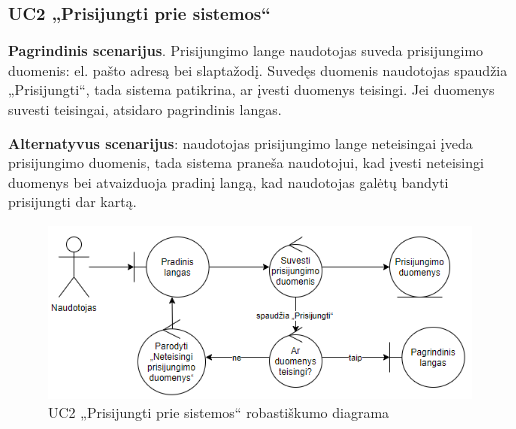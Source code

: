 \documentclass{VUMIFPSbakalaurinis}
\begin{document}
\subsubsection{UC2 „Prisijungti prie sistemos“}
\textbf{Pagrindinis scenarijus}. Prisijungimo lange naudotojas suveda prisijungimo duomenis: el. pašto adresą bei slaptažodį. Suvedęs duomenis naudotojas spaudžia „Prisijungti“, tada sistema patikrina, ar įvesti duomenys teisingi. Jei duomenys suvesti teisingai, atsidaro pagrindinis langas.
\par \textbf{Alternatyvus scenarijus}: naudotojas prisijungimo lange neteisingai įveda prisijungimo duomenis, tada sistema praneša naudotojui, kad įvesti neteisingi duomenys bei atvaizduoja pradinį langą, kad naudotojas galėtų bandyti prisijungti dar kartą.

\begin{figure}[H]
	\centering
	\includegraphics[scale=0.6]{img/Robustness/UC2}
	\caption{UC2 „Prisijungti prie sistemos“ robastiškumo diagrama}
	\label{img:uc2rob}
\end{figure}
\end{document}
